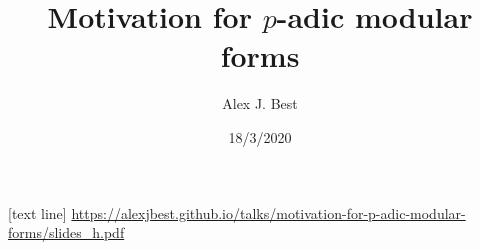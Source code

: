 
\beamertemplatenavigationsymbolsempty

\usepackage{amsmath, amssymb, amsfonts, tikz}
\usepackage[utf8]{inputenc}
\usepackage[T1]{fontenc}
\usepackage[english]{babel}

\usepackage{amsthm}
\theoremstyle{plain}
\newtheorem{theorem}{Theorem}[section]
\newtheorem{corollary}[theorem]{Corollary}
\newtheorem{lemma}[theorem]{Lemma}
\newtheorem{algorithm}[theorem]{Algorithm}
\newtheorem{proposition}[theorem]{Proposition}
\newtheorem{claim}[theorem]{Claim}
\newtheorem{fact}[theorem]{Fact}
\newtheorem{conjecture}[theorem]{Conjecture}
\theoremstyle{definition}
\newtheorem{definition}[theorem]{Definition}
\theoremstyle{definition}
\newtheorem{remark}[theorem]{Remark}
\newtheorem{observation}[theorem]{Observation}
\theoremstyle{definition}
\newtheorem{example}[theorem]{Example}
\newtheorem{question}[theorem]{Question}
\newcommand{\terminology}[1]{\textbf{#1}}

\newcommand{\NN}{\mathbf{N}}
\newcommand{\ZZ}{\mathbf{Z}}
\newcommand{\QQ}{\mathbf Q}
\newcommand{\CC}{\mathbf C}
\newcommand{\RR}{\mathbf R}
\newcommand{\FF}{\mathbf F}
\newcommand{\dR}{\mathrm{dR}}
\newcommand{\lt}{<}
\newcommand{\gt}{>}
\newcommand{\amp}{&}
\newcommand{\diff}{\mathop{}\!\mathrm{d}}
\newcommand{\ints}{\mathcal{O}}
\newcommand{\ideal}[1]{\mathfrak{#1}}
\usepackage{mathrsfs}\usepackage{cancel}
\newcommand{\Gal}[2]{\operatorname{Gal}(#1/#2)}
\newcommand{\absgal}[1]{\operatorname{Gal}(\overline{#1}/#1)}

\newcommand{\sheaf}[1]{\operatorname{\mathcal{#1}}}
\newcommand{\inv}{^{-1}}
\DeclareMathOperator{\norm}{Nm}
\DeclareMathOperator{\ord}{ord}
\DeclareMathOperator{\divisor}{div}
\DeclareMathOperator{\PP}{\mathbf{P}}
\DeclareMathOperator{\Hom}{Hom}
\DeclareMathOperator{\coker}{coker}

\newcommand{\lb}{[}
\newcommand{\rb}{]}

\author{Alex J. Best}
\date{18/3/2020}
\title{Motivation for $p$-adic modular forms}
[text line]
{\url{https://alexjbest.github.io/talks/motivation-for-p-adic-modular-forms/slides_h.pdf}}


